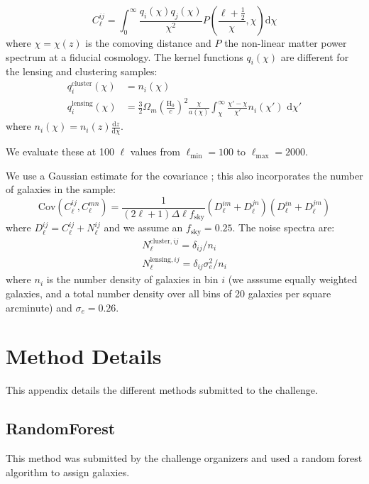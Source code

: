 \documentclass[twocolumn,twocolappendix]{aastex63}
\begin{document}
\begin{equation}
    C^{ij}_\ell = \int_0^{\infty} \frac{q_i(\chi) q_j(\chi)}{\chi^2} P\left(\frac{\ell +\frac{1}{2}}{\chi}, \chi \right) \mathrm{d}\chi
\end{equation}
where $\chi = \chi(z)$ is the comoving distance and $P$ the non-linear matter power spectrum at
a fiducial cosmology.  The kernel functions $q_i(\chi)$ are different for the lensing and clustering samples:
\begin{align}
    q^{\mathrm{cluster}}_i(\chi) &= n_i(\chi)\\
    q^{\mathrm{lensing}}_i(\chi) &= \frac{3}{2}\Omega_m \left(\frac{\mathrm{H}_0}{c}\right)^2 \frac{\chi}{a(\chi)} \int_\chi^{\infty} \frac{\chi' - \chi}{\chi'} n_i(\chi')\,\,\mathrm{d}\chi'
\end{align}
where $n_i(\chi) = n_i(z) \frac{\mathrm{d}z}{\mathrm{d}\chi}$.

We evaluate these at 100 $\ell$ values from $\ell_\mathrm{min}=100$ to $\ell_\mathrm{max}=2000$.

We use a Gaussian estimate for the covariance \citep{takada_jain}; this also incorporates the number of galaxies in the
sample:
\begin{equation}
    \mathrm{Cov}(C^{ij}_\ell, C^{mn}_\ell) = \frac{1}{(2 \ell + 1)\Delta\ell f_\mathrm{sky}}(D^{im}_\ell + D^{jn}_\ell)(D^{in}_\ell + D^{jm}_\ell)
\end{equation}
where $D^{ij}_\ell = C^{ij}_\ell + N^{ij}_\ell$ and we assume an $f_\mathrm{sky}=0.25$.  The noise spectra are:
\begin{align}
N^{\mathrm{cluster},ij}_\ell = \delta_{ij} / n_i \\
N^{\mathrm{lensing},ij}_\ell = \delta_{ij} \sigma_e^2 / n_i
\end{align}
where $n_i$ is the number density of galaxies in bin $i$ (we asssume equally weighted galaxies, and a 
total number density over all bins of 20 galaxies per square arcminute) and $\sigma_e=0.26$.



\section{Method Details} \label{app:methods}
This appendix details the different methods submitted to the challenge.

\subsection{ {\sc RandomForest} } \label{sec:randomforest}
This method was submitted by the challenge organizers and used a random
forest algorithm to assign galaxies.
\end{document}
